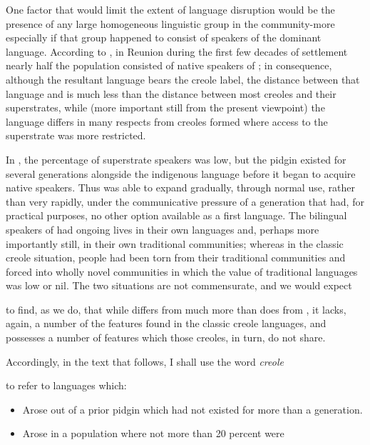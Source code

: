 One factor that would limit the extent of language disruption would be the presence of any large homogeneous linguistic group in the community-more especially if that group happened to consist of speakers of the dominant language. According to \citet{Chaudenson1974}, in Reunion during the first few decades of settlement nearly half the population consisted of native speakers of  ; in conse\-quence, although the resultant language bears the creole label, the distance between that language and  is much less than the distance between most creoles and their superstrates, while (more important still from the present viewpoint) the language differs in many respects from creoles formed where access to the superstrate was more restricted.

In , the percentage of superstrate speakers was low, but the pidgin existed for several generations alongside the indigenous language before it began to acquire native speakers. Thus  was able to expand gradually, through normal use, rather than very rapidly, under the communicative pressure of a generation that had, for practical purposes, no other option available as a first language. The bilingual speakers of  had ongoing lives in their own languages and, perhaps more importantly still, in their own traditional communities; whereas in the classic creole situation, people had been torn from their traditional communities and forced into wholly novel communities in which the value of traditional languages was low or nil. The two situations are not commensurate, and we would expect

  


 


to find, as we do, that while  differs from  much more than  does from , it lacks, again, a number of the features found in the classic creole languages, and possesses a number of features which those creoles, in turn, do not share.

Accordingly, in the text that follows, I shall use the word \textit{creole}

to refer to languages which:


\begin{itemize}
\item Arose out of a prior pidgin which had not existed for more than a generation.
\item Arose in a population where not more than 20 percent were
\end{itemize}

